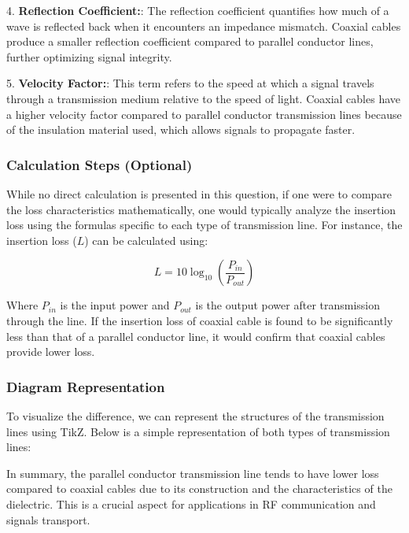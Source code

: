 4. \textbf{Reflection Coefficient:}: The reflection coefficient quantifies how much of a wave is reflected back when it encounters an impedance mismatch. Coaxial cables produce a smaller reflection coefficient compared to parallel conductor lines, further optimizing signal integrity.

5. \textbf{Velocity Factor:}: This term refers to the speed at which a signal travels through a transmission medium relative to the speed of light. Coaxial cables have a higher velocity factor compared to parallel conductor transmission lines because of the insulation material used, which allows signals to propagate faster.

\subsubsection{Calculation Steps (Optional)}

While no direct calculation is presented in this question, if one were to compare the loss characteristics mathematically, one would typically analyze the insertion loss using the formulas specific to each type of transmission line. For instance, the insertion loss (\(L\)) can be calculated using:

\[
L = 10 \log_{10} \left( \frac{P_{in}}{P_{out}} \right)
\]

Where \(P_{in}\) is the input power and \(P_{out}\) is the output power after transmission through the line. If the insertion loss of coaxial cable is found to be significantly less than that of a parallel conductor line, it would confirm that coaxial cables provide lower loss.

\subsubsection{Diagram Representation}

To visualize the difference, we can represent the structures of the transmission lines using TikZ. Below is a simple representation of both types of transmission lines:


In summary, the parallel conductor transmission line tends to have lower loss compared to coaxial cables due to its construction and the characteristics of the dielectric. This is a crucial aspect for applications in RF communication and signals transport.
